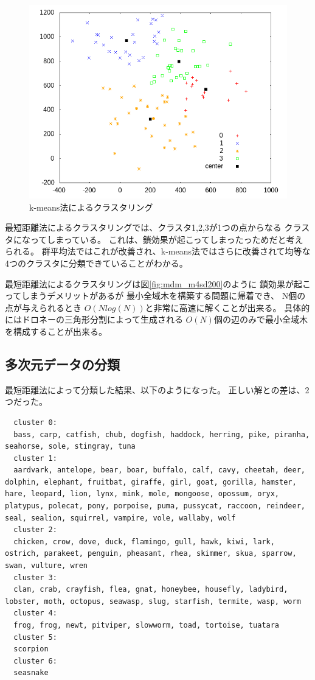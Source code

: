 \documentclass[dvipdfmx]{jsarticle}
\begin{document}
\begin{figure}[htbp]
  \centering
  \includegraphics[width=0.5\hsize]{./pic/k_means/m4sd200_plot.png}
  \caption{k-means法によるクラスタリング}
  \label{fig:km_m4sd200}
\end{figure}


最短距離法によるクラスタリングでは、クラスタ1,2,3が1つの点からなる
クラスタになってしまっている。
これは、鎖効果が起こってしまったっためだと考えられる。
群平均法ではこれが改善され、k-means法ではさらに改善されて均等な
4つのクラスタに分類できていることがわかる。

最短距離法によるクラスタリングは図\ref{fig:mdm_m4sd200}のように
鎖効果が起こってしまうデメリットがあるが
最小全域木を構築する問題に帰着でき、
N個の点が与えられるとき
$O(Nlog(N))$と非常に高速に解くことが出来る。
具体的にはドロネーの三角形分割によって生成される
$O(N)$個の辺のみで最小全域木を構成することが出来る。


\subsection{多次元データの分類}

最短距離法によって分類した結果、以下のようになった。
正しい解との差は、2つだった。

\begin{verbatim}
  cluster 0:
  bass, carp, catfish, chub, dogfish, haddock, herring, pike, piranha, seahorse, sole, stingray, tuna
  cluster 1:
  aardvark, antelope, bear, boar, buffalo, calf, cavy, cheetah, deer, dolphin, elephant, fruitbat, giraffe, girl, goat, gorilla, hamster, hare, leopard, lion, lynx, mink, mole, mongoose, opossum, oryx, platypus, polecat, pony, porpoise, puma, pussycat, raccoon, reindeer, seal, sealion, squirrel, vampire, vole, wallaby, wolf
  cluster 2:
  chicken, crow, dove, duck, flamingo, gull, hawk, kiwi, lark, ostrich, parakeet, penguin, pheasant, rhea, skimmer, skua, sparrow, swan, vulture, wren
  cluster 3:
  clam, crab, crayfish, flea, gnat, honeybee, housefly, ladybird, lobster, moth, octopus, seawasp, slug, starfish, termite, wasp, worm
  cluster 4:
  frog, frog, newt, pitviper, slowworm, toad, tortoise, tuatara
  cluster 5:
  scorpion
  cluster 6:
  seasnake
\end{verbatim}
\end{document}
